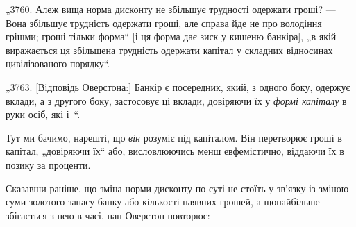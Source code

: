 „3760. Алеж вища норма дисконту не збільшує трудності
одержати гроші? — Вона збільшує трудність одержати гроші, але
справа йде не про володіння грішми; гроші тільки форма“ [і ця
форма дає зиск у кишеню банкіра], „в якій виражається ця збільшена трудність одержати капітал у
складних відносинах цивілізованого порядку“.

„3763. [Відповідь Оверстона:] Банкір є посередник, який,
з одного боку, одержує вклади, а з другого боку, застосовує
ці вклади, довіряючи їх у \emph{формі капіталу} в руки осіб, які
і~“.

Тут ми бачимо, нарешті, що \emph{він} розуміє під капіталом. Він
перетворює гроші в капітал, „довіряючи їх“ або, висловлюючись
менш евфемістично, віддаючи їх в позику за проценти.

Сказавши раніше, що зміна норми дисконту по суті не стоїть
у зв’язку із зміною суми золотого запасу банку або кількості
наявних грошей, а щонайбільше збігається з нею в часі, пан
Оверстон повторює:
